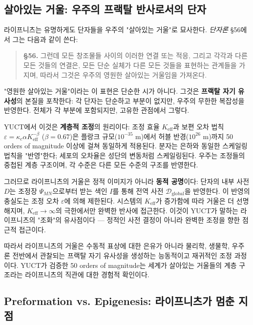 \documentclass[12pt,a4paper]{article}
\begin{document}
	\subsection{살아있는 거울: 우주의 프랙탈 반사로서의 단자}
	
	라이프니츠는 유명하게도 단자들을 우주의 "살아있는 거울"로 묘사한다. \emph{단자론} §56에서 그는 다음과 같이 쓴다:
	
	\begin{quote}
		\textbf{§56.} 그런데 모든 창조물들 사이의 이러한 연결 또는 적응, 그리고 각각과 다른 모든 것들의 연결은, 모든 단순 실체가 다른 모든 것들을 표현하는 관계들을 가지며, 따라서 그것은 우주의 영원한 살아있는 거울임을 가져온다.
	\end{quote}
	
	"영원한 살아있는 거울"이라는 이 표현은 단순한 시가 아니다. 그것은 \textbf{프랙탈 자기 유사성}의 본질을 포착한다: 각 단자는 단순하고 부분이 없지만, 우주의 무한한 복잡성을 반영한다. 전체가 각 부분에 포함되지만, 고유한 관점에서 그렇다.
	
	YUCT에서 이것은 \textbf{계층적 조정}의 원리이다: 조정 효율 \(K_{\mathrm{eff}}\)과 보편 오차 법칙 \(\varepsilon = \kappa_c \alpha K_{\mathrm{eff}}^{-\beta}\) (\(\beta=0.67\))은 플랑크 규모(\(10^{-35}\) m)에서 허블 반경(\(10^{26}\) m)까지 50 orders of magnitude 이상에 걸쳐 동일하게 적용된다. 분자는 은하와 동일한 스케일링 법칙을 "반영"한다; 세포의 오차율은 성단의 변동처럼 스케일링된다. 우주는 조정들의 중첩된 계층 구조이며, 각 수준은 다른 모든 수준의 구조를 반영한다.
	
	그러므로 라이프니츠의 거울은 정적 이미지가 아니라 \textbf{동적 공명}이다: 단자의 내부 사전 \(D\)는 조정장 \(\Psi_{MN}\)으로부터 받는 색인 \(I\)를 통해 전역 사전 \(\mathcal{D}_{\text{global}}\)을 반영한다. 이 반영의 충실도는 조정 오차 \(\varepsilon\)에 의해 제한된다. 시스템의 \(K_{\mathrm{eff}}\)가 증가함에 따라 거울은 더 선명해지며, \(K_{\mathrm{eff}} \to \infty\)의 극한에서만 완벽한 반사에 접근한다. 이것이 YUCT가 말하는 라이프니츠의 "조화"의 유사점이다 — 정적인 사전 결정이 아니라 완벽한 조정을 향한 점근적 접근이다.
	
	따라서 라이프니츠의 거울은 수동적 표상에 대한 은유가 아니라 물리학, 생물학, 우주론 전반에서 관찰되는 프랙탈 자기 유사성을 생성하는 능동적이고 재귀적인 조정 과정이다. YUCT가 검증한 50 orders of magnitude는 세계가 살아있는 거울들의 계층 구조라는 라이프니츠의 직관에 대한 경험적 확인이다.
	
	\subsection{Preformation vs. Epigenesis: 라이프니츠가 멈춘 지점}
	
\end{document}

